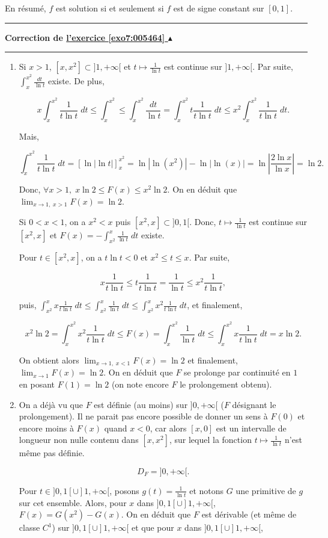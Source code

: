\documentclass[11pt,a4paper]{article}
\newcounter{exo}
\newcommand{\correction}[1]{\hypertarget{cor7:#1}{}\label{cor7:#1}{\bf Correction de \hyperlink{exo7:#1}{l'exercice \ref{exo7:#1} $\blacktriangle$}}\vspace{1mm}\hrule\vspace{1mm}}
\newcommand{\fincorrection}{\vspace{1mm}\hrule\vspace*{7mm}}
\begin{document}
En résumé, $f$ est solution si et seulement si $f$ est de signe constant sur $[0,1]$.
\fincorrection
\correction{005464}
\begin{enumerate}
\item  Si $x>1$, $[x,x^2]\subset]1,+\infty[$ et $t\mapsto\frac{1}{\ln t}$ est continue sur $]1,+\infty[$. Par suite, $\int_{x}^{x^2}\frac{dt}{\ln t}$ existe. De plus,

$$x\int_{x}^{x^2}\frac{1}{t\ln t}\;dt\leq\int_{x}^{x^2}\leq\int_{x}^{x^2}\frac{dt}{\ln t}=\int_{x}^{x^2}t\frac{1}{t\ln t}\;dt\leq x^2\int_{x}^{x^2}\frac{1}{t\ln t}\;dt.$$

Mais, 

$$\int_{x}^{x^2}\frac{1}{t\ln t}\;dt=\left[\ln|\ln t|\right]_{x}^{x^2}=\ln|\ln(x^2)|-\ln|\ln(x)|=\ln\left|\frac{2\ln x}{\ln x}\right|=\ln2.$$

Donc, $\forall x>1,\;x\ln2\leq F(x)\leq x^2\ln2$. On en déduit que $\lim_{x\rightarrow 1,\;x>1}F(x)=\ln2$.

Si $0<x<1$, on a $x^2<x$ puis $[x^2,x]\subset]0,1[$. Donc, $t\mapsto\frac{1}{\ln t}$ est continue sur $[x^2,x]$ et $F(x)=-\int_{x^2}^{x}\frac{1}{\ln t}\;dt$ existe.

Pour $t\in[x^2,x]$, on a $t\ln t<0$ et $x^2\leq t\leq x$. Par suite, 

$$x\frac{1}{t\ln t}\leq t\frac{1}{t\ln t}=\frac{1}{\ln t}\leq x^2\frac{1}{t\ln t},$$

puis, $\int_{x^2}^{x}x\frac{1}{t\ln t}\;dt\leq\int_{x^2}^{x}\frac{1}{\ln t}\;dt\leq\int_{x^2}^{x}x^2\frac{1}{t\ln t}\;dt$, et finalement,

$$x^2\ln2=\int_{x}^{x^2}x^2\frac{1}{t\ln t}\;dt\leq F(x)=\int_{x}^{x^2}\frac{1}{\ln t}\;dt\leq\int_{x}^{x^2}x\frac{1}{t\ln t}\;dt=x\ln 2.$$

On obtient alors $\lim_{x\rightarrow 1,\;x<1}F(x)=\ln2$ et finalement, $\lim_{x\rightarrow 1}F(x)=\ln2$. On en déduit que $F$ se prolonge par continuité en $1$ en posant $F(1)=\ln 2$ (on note encore $F$ le prolongement obtenu).

\item  On a déjà vu que $F$ est définie (au moins) sur $]0,+\infty[$ ($F$ désignant le prolongement). Il ne parait pas encore possible de donner un sens à $F(0)$ et encore moins à $F(x)$ quand $x<0$, car alors $[x,0]$ est un intervalle de longueur non nulle contenu dans $[x,x^2]$, sur lequel la fonction $t\mapsto\frac{1}{\ln t}$ n'est même pas définie.

$$D_F=]0,+\infty[.$$

Pour $t\in]0,1[\cup]1,+\infty[$, posons $g(t)=\frac{1}{\ln t}$ et notons $G$ une primitive de $g$ sur cet ensemble. Alors, pour $x$ dans $]0,1[\cup]1,+\infty[$, $F(x)=G(x^2)-G(x)$. On en déduit que $F$ est dérivable (et même de classe $C^1$) sur $]0,1[\cup]1,+\infty[$ et que pour $x$ dans $]0,1[\cup]1,+\infty[$,


\end{enumerate}
\end{document}
